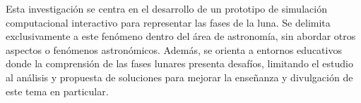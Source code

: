 Esta investigación se centra en el desarrollo de un prototipo de simulación computacional interactivo para representar las fases de la luna. Se delimita exclusivamente a este fenómeno dentro del área de astronomía, sin abordar otros aspectos o fenómenos astronómicos. Además, se orienta a entornos educativos donde la comprensión de las fases lunares presenta desafíos, limitando el estudio al análisis y propuesta de soluciones para mejorar la enseñanza y divulgación de este tema en particular.
